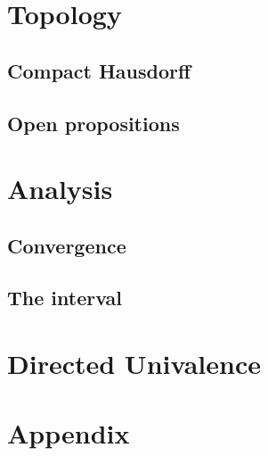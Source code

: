 \documentclass{../util/zariski}
\begin{document}
\section{Topology}


\subsection{Compact Hausdorff}



\subsection{Open propositions}


\section{Analysis}

\subsection{Convergence}



\subsection{The interval}
%


\section{Directed Univalence}


\appendix
\section{Appendix}


\printbibliography
\end{document}
